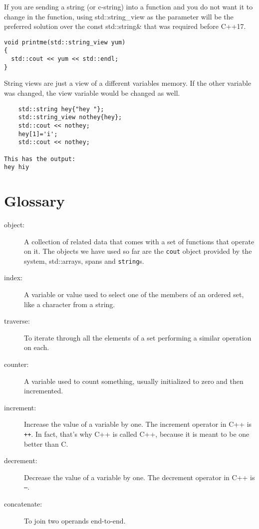 If you are sending a string (or c-string) into a function
and you do not want it to change in the function, using std::string\_view as the parameter will be the preferred solution over the const std::string\& that 
was required before C++17.

\begin{verbatim}
void printme(std::string_view yum)
{
  std::cout << yum << std::endl;
}
\end{verbatim}

String views are just a view of a different variables memory. If the
other variable was changed, the view variable would be changed as well.

\begin{verbatim}
    std::string hey{"hey "};
    std::string_view nothey{hey};
    std::cout << nothey;
    hey[1]='i';
    std::cout << nothey;
    
This has the output:
hey hiy
\end{verbatim}

\section{Glossary}

\begin{description}

\item[object:] A collection of related data that comes with a set of
functions that operate on it.  The objects we have used so far are the
{\tt cout} object provided by the system, std::arrays, spans and {\tt string}s.

\item[index:]  A variable or value used to select one of the
members of an ordered set, like a character from a string.

\item[traverse:]  To iterate through all the elements of a set
performing a similar operation on each.

\item[counter:]  A variable used to count something, usually
initialized to zero and then incremented.

\item[increment:]  Increase the value of a variable by one.
The increment operator in C++ is {\tt ++}.  In fact, that's
why C++ is called C++, because it is meant to be one better
than C.

\item[decrement:]  Decrease the value of a variable by one.
The decrement operator in C++ is {\tt --}.

\item[concatenate:] To join two operands end-to-end.


\end{description}
